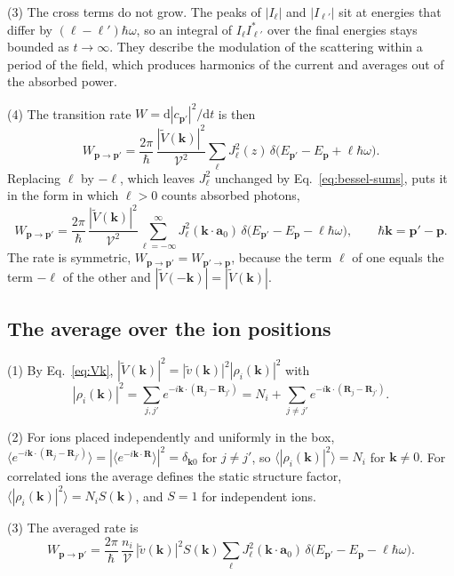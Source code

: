 \documentclass[11pt]{article}
\numberwithin{equation}{section}
\newcommand{\Vol}{\mathcal V}
\newcommand{\av}{\mathbf a_0}
\newcommand{\kv}{\mathbf k}
\newcommand{\pv}{\mathbf p}
\newcommand{\Rv}{\mathbf R}
\newcommand{\dd}{\mathrm d}
\begin{document}
{\noindent}(3) The cross terms do not grow. The peaks of $|I_\ell|$ and
$|I_{\ell'}|$ sit at energies that differ by $(\ell-\ell')\hbar\omega$, so an
integral of $I_\ell I^*_{\ell'}$ over the final energies stays bounded as
$t\to\infty$. They describe the modulation of the scattering within a period
of the field, which produces harmonics of the current \cite{Silin1965} and
averages out of the absorbed power.

{\noindent}(4) The transition rate $W=\dd|c_{\pv'}|^2/\dd t$ is then
\begin{equation}
W_{\pv\to\pv'}=\frac{2\pi}{\hbar}\,\frac{|\tilde V(\kv)|^2}{\Vol^2}\sum_\ell J_\ell^2(z)\,
\delta\big(E_{\pv'}-E_{\pv}+\ell\hbar\omega\big).
\end{equation}
Replacing $\ell$ by $-\ell$, which leaves $J_\ell^2$ unchanged by
Eq.~\eqref{eq:bessel-sums}, puts it in the form in which $\ell>0$ counts
absorbed photons,
\begin{equation}
\boxed{\;W_{\pv\to\pv'}=\frac{2\pi}{\hbar}\,\frac{|\tilde V(\kv)|^2}{\Vol^2}\sum_{\ell=-\infty}^{\infty}
J_\ell^2(\kv\cdot\av)\,\delta\big(E_{\pv'}-E_{\pv}-\ell\hbar\omega\big),\qquad\hbar\kv=\pv'-\pv.\;}
\label{eq:rate}
\end{equation}
The rate is symmetric, $W_{\pv\to\pv'}=W_{\pv'\to\pv}$, because the term
$\ell$ of one equals the term $-\ell$ of the other and $|\tilde V(-\kv)|=|\tilde V(\kv)|$.

\subsection{The average over the ion positions}
{\noindent}(1) By Eq.~\eqref{eq:Vk},
$|\tilde V(\kv)|^2=|\tilde v(\kv)|^2|\rho_i(\kv)|^2$ with
\begin{equation}
|\rho_i(\kv)|^2=\sum_{j,j'}e^{-i\kv\cdot(\Rv_j-\Rv_{j'})}=N_i+\sum_{j\neq j'}e^{-i\kv\cdot(\Rv_j-\Rv_{j'})}.
\end{equation}

{\noindent}(2) For ions placed independently and uniformly in the box,
$\langle e^{-i\kv\cdot(\Rv_j-\Rv_{j'})}\rangle=|\langle e^{-i\kv\cdot\Rv}\rangle|^2=\delta_{\kv0}$
for $j\neq j'$, so $\langle|\rho_i(\kv)|^2\rangle=N_i$ for $\kv\neq0$. For
correlated ions the average defines the static structure factor,
$\langle|\rho_i(\kv)|^2\rangle=N_iS(\kv)$, and $S=1$ for independent ions.

{\noindent}(3) The averaged rate is
\begin{equation}
\boxed{\;W_{\pv\to\pv'}=\frac{2\pi}{\hbar}\,\frac{n_i}{\Vol}\,|\tilde v(\kv)|^2S(\kv)\sum_\ell
J_\ell^2(\kv\cdot\av)\,\delta\big(E_{\pv'}-E_{\pv}-\ell\hbar\omega\big).\;}
\label{eq:rate-ions}
\end{equation}
\end{document}
